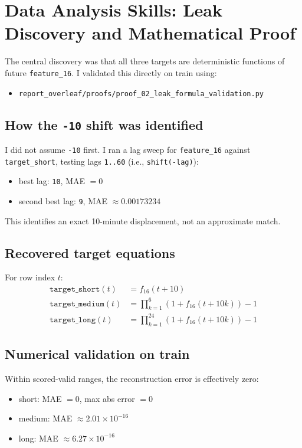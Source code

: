 \section{Data Analysis Skills: Leak Discovery and Mathematical Proof}

The central discovery was that all three targets are deterministic functions of future \texttt{feature\_16}. I validated this directly on train using:
\begin{itemize}[leftmargin=1.5em]
  \item \texttt{report\_overleaf/proofs/proof\_02\_leak\_formula\_validation.py}
\end{itemize}

\subsection{How the \texttt{-10} shift was identified}
I did not assume \texttt{-10} first. I ran a lag sweep for \texttt{feature\_16} against \texttt{target\_short}, testing lags \texttt{1..60} (i.e., \texttt{shift(-lag)}):
\begin{itemize}[leftmargin=1.5em]
  \item best lag: \texttt{10}, MAE $=0$
  \item second best lag: \texttt{9}, MAE $\approx 0.00173234$
\end{itemize}
This identifies an exact 10-minute displacement, not an approximate match.

\subsection{Recovered target equations}
For row index $t$:
\begin{align}
\texttt{target\_short}(t) &= f_{16}(t+10) \\
\texttt{target\_medium}(t) &= \prod_{k=1}^{6} (1 + f_{16}(t+10k)) - 1 \\
\texttt{target\_long}(t) &= \prod_{k=1}^{24} (1 + f_{16}(t+10k)) - 1
\end{align}

\subsection{Numerical validation on train}
Within scored-valid ranges, the reconstruction error is effectively zero:
\begin{itemize}[leftmargin=1.5em]
  \item short: MAE $=0$, max abs error $=0$
  \item medium: MAE $\approx 2.01\times 10^{-16}$
  \item long: MAE $\approx 6.27\times 10^{-16}$
\end{itemize}

